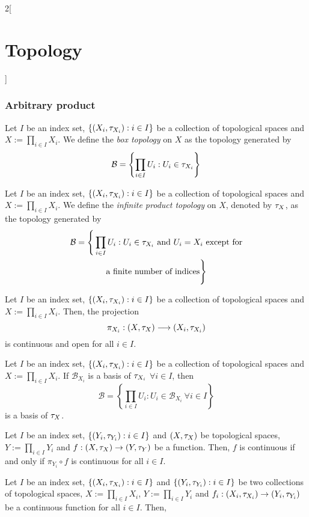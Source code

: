 \documentclass[../../../main.tex]{subfiles}
\begin{document}
\begin{multicols}{2}[\section{Topology}]
  \subsubsection{Arbitrary product}
  \begin{definition}
    Let $I$ be an index set, $\{(X_i,\tau_{X_i}):i\in I\}$ be a collection of topological spaces and $X:=\prod_{i\in I}X_i$. We define the \textit{box topology} on $X$ as the topology generated by $$\mathcal{B}=\left\{\prod_{i\in I}U_i:U_i\in\tau_{X_i}\right\}$$
  \end{definition}
  \begin{definition}
    Let $I$ be an index set, $\{(X_i,\tau_{X_i}):i\in I\}$ be a collection of topological spaces and $X:=\prod_{i\in I}X_i$. We define the \textit{infinite product topology} on $X$, denoted by $\tau_X$, as the topology generated by
    \begin{multline*}
      \mathcal{B}=\Bigg\{\prod_{i\in I}U_i:U_i\in\tau_{X_i}\text{ and $U_i=X_i$ except for}\\\text{a finite number of indices}\Bigg\}
    \end{multline*}
  \end{definition}
  \begin{prop}
    Let $I$ be an index set, $\{(X_i,\tau_{X_i}):i\in I\}$ be a collection of topological spaces and $X:=\prod_{i\in I}X_i$. Then, the projection $$\pi_{X_i}:\left(X,\tau_X\right)\longrightarrow (X_i,\tau_{X_i})$$
    is continuous and open for all $i\in I$.
  \end{prop}
  \begin{prop}
    Let $I$ be an index set, $\{(X_i,\tau_{X_i}):i\in I\}$ be a collection of topological spaces and $X:=\prod_{i\in I}X_i$. If $\mathcal{B}_{X_i}$ is a basis of $\tau_{X_i}$ $\forall i\in I$, then $$\mathcal{B}=\left\{\prod_{i\in I}U_i:U_i\in\mathcal{B}_{X_i}\ \forall i\in I\right\}$$
    is a basis of $\tau_X$.
  \end{prop}
  \begin{prop}
    Let $I$ be an index set, $\{(Y_i,\tau_{Y_i}):i\in I\}$ and $(X,\tau_X)$ be topological spaces, $Y:=\prod_{i\in I}Y_i$ and $f:(X,\tau_X)\rightarrow(Y,\tau_Y)$ be a function. Then, $f$ is continuous if and only if $\pi_{Y_i}\circ f$ is continuous for all $i\in I$.
  \end{prop}
  \begin{prop}
    Let $I$ be an index set, $\{(X_i,\tau_{X_i}):i\in I\}$ and $\{(Y_i,\tau_{Y_i}):i\in I\}$ be two collections of topological spaces, $X:=\prod_{i\in I}X_i$, $Y:=\prod_{i\in I}Y_i$ and $f_i:(X_i,\tau_{X_i})\rightarrow(Y_i,\tau_{Y_i})$ be a continuous function for all $i\in I$. Then,

\end{prop}
\end{multicols}
\end{document}
